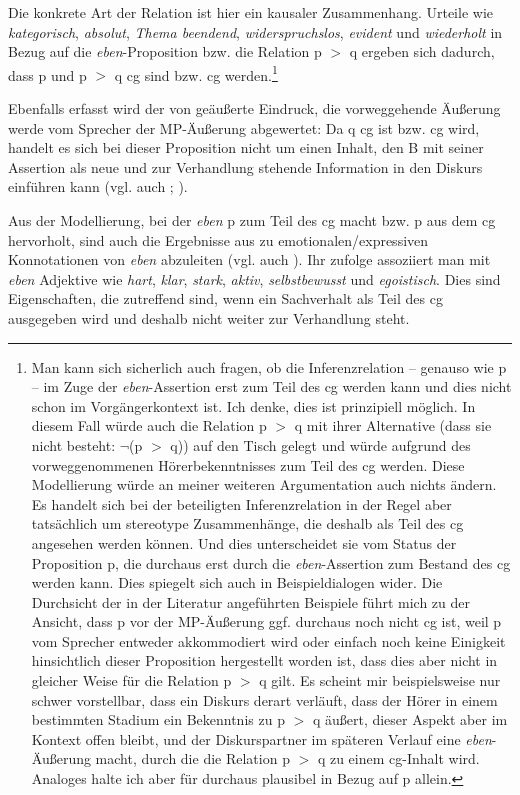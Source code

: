 Die konkrete Art der Relation ist hier ein kausaler Zusammenhang. Urteile wie \textit{kategorisch}, \textit{absolut}, \textit{Thema beendend}, \textit{widerspruchslos}, \textit{evident} und \textit{wiederholt} in Bezug auf die \textit{eben}-Proposition bzw. die Relation p $>$ q ergeben sich dadurch, dass p und p $>$ q cg sind bzw. cg werden.\footnote{Man kann sich sicherlich auch fragen, ob die Inferenzrelation – genauso wie p – im Zuge der \textit{eben}-Assertion erst zum Teil des cg werden kann und dies nicht schon im Vorgängerkontext ist. Ich denke, dies ist prinzipiell möglich. In diesem Fall würde auch die Relation p $>$ q mit ihrer Alternative (dass sie nicht besteht: $\neg$(p $>$ q)) auf den Tisch gelegt und würde aufgrund des vorweggenommenen Hörerbekenntnisses zum Teil des cg werden. Diese Modellierung würde an meiner weiteren Argumentation auch nichts ändern. Es handelt sich bei der beteiligten Inferenzrelation in der Regel aber tatsächlich um stereotype Zusammenhänge, die deshalb als Teil des cg angesehen werden können. Und dies unterscheidet sie vom Status der Proposition p, die durchaus erst durch die \textit{eben}-Assertion zum Bestand des cg werden kann. Dies spiegelt sich auch in Beispieldialogen wider. Die Durchsicht der in der Literatur angeführten Beispiele führt mich zu der Ansicht, dass p vor der MP-Äußerung ggf. durchaus noch nicht cg ist, weil p vom Sprecher entweder akkommodiert wird oder einfach noch keine Einigkeit hinsichtlich dieser Proposition hergestellt worden ist, dass dies aber nicht in gleicher Weise für die Relation p $>$ q gilt. Es scheint mir beispielsweise nur schwer vorstellbar, dass ein Diskurs derart verläuft, dass der Hörer in einem bestimmten Stadium ein Bekenntnis zu p $>$ q äußert, dieser Aspekt aber im Kontext offen bleibt, und der Diskurspartner im späteren Verlauf eine \textit{eben}-Äußerung macht, durch die die Relation p $>$ q zu einem cg-Inhalt wird. Analoges halte ich aber für durchaus plausibel in Bezug auf p allein.}

Ebenfalls erfasst wird der von \citet{Dahl1988} geäußerte Eindruck, die vorweggehende Äußerung werde vom Sprecher der MP-Äußerung abgewertet: Da q cg ist bzw. cg wird, handelt es sich bei dieser Proposition nicht um einen Inhalt, den B mit seiner Assertion als neue und zur Verhandlung stehende Information in den Diskurs einführen kann (vgl. auch \citealt[340-341]{Karagjosova2003}; \citeyear[208-209]{Karagjosova2004}).

Aus der Modellierung, bei der \textit{eben} p zum Teil des cg macht bzw. p aus dem cg hervorholt, sind auch die Ergebnisse aus \citet[185]{Hentschel1986} zu emotionalen/ex\-pressiven Konnotationen von \textit{eben} abzuleiten (vgl. auch \citealt[125, Fn 47]{Thurmair1989}). Ihr zufolge assoziiert man mit \textit{eben} Adjektive wie \textit{hart}, \textit{klar}, \textit{stark}, \textit{aktiv}, \textit{selbstbewusst} und \textit{egoistisch}. Dies sind Eigenschaften, die zutreffend sind, wenn ein Sachverhalt als Teil des cg ausgegeben wird und deshalb nicht weiter zur Verhandlung steht.\\


